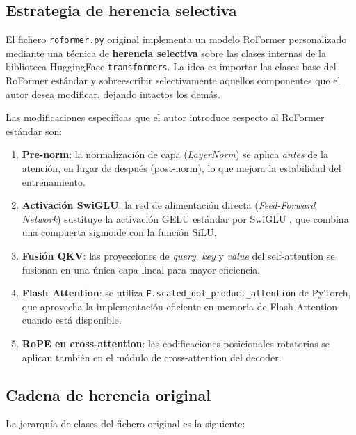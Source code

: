\documentclass[12pt,a4paper]{article}
\begin{document}
\subsection{Estrategia de herencia selectiva}

El fichero \texttt{roformer.py} original implementa un modelo RoFormer
\cite{su2021roformer} personalizado mediante una técnica de \textbf{herencia selectiva}
sobre las clases internas de la biblioteca HuggingFace \texttt{transformers}.
La idea es importar las clases base del RoFormer estándar y sobreescribir selectivamente
aquellos componentes que el autor desea modificar, dejando intactos los demás.

Las modificaciones específicas que el autor introduce respecto al RoFormer estándar son:
\begin{enumerate}[label=\alph*)]
  \item \textbf{Pre-norm}: la normalización de capa (\textit{LayerNorm}) se aplica
        \textit{antes} de la atención, en lugar de después (post-norm), lo que mejora
        la estabilidad del entrenamiento.
  \item \textbf{Activación SwiGLU}: la red de alimentación directa
        (\textit{Feed-Forward Network}) sustituye la activación GELU estándar por
        SwiGLU \cite{shazeer2020glu}, que combina una compuerta sigmoide con
        la función SiLU.
  \item \textbf{Fusión QKV}: las proyecciones de \textit{query}, \textit{key} y
        \textit{value} del self-attention se fusionan en una única capa lineal para
        mayor eficiencia.
  \item \textbf{Flash Attention}: se utiliza \texttt{F.scaled\_dot\_product\_attention}
        de PyTorch, que aprovecha la implementación eficiente en memoria de Flash
        Attention cuando está disponible.
  \item \textbf{RoPE en cross-attention}: las codificaciones posicionales rotatorias
        se aplican también en el módulo de cross-attention del decoder.
\end{enumerate}

\subsection{Cadena de herencia original}

La jerarquía de clases del fichero original es la siguiente:
\end{document}
